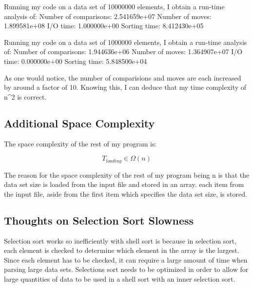 \documentclass{article}
\begin{document}
Running my code on a data set of 10000000 elements, I obtain a run-time analysis of: \newline \newline
\indent Number of comparisons: 2.541659e+07 \newline
\indent Number of moves: 1.899581e+08 \newline
\indent I/O time: 1.000000e+00 \newline
\indent Sorting time: 8.412430e+05 \newline

\noindent Running my code on a data set of 1000000 elements, I obtain a run-time analysis of: \newline \newline
\indent Number of comparisons: 1.944636e+06 \newline
\indent Number of moves: 1.364907e+07 \newline
\indent I/O time: 0.000000e+00 \newline
\indent Sorting time: 5.848500e+04 \newline

\noindent As one would notice, the number of comparisions and moves are each increased by around a factor of 10.
Knowing this, I can deduce that my time complexity of n\^{}2 is correct.

\subsection*{Additional Space Complexity}

The space complexity of the rest of my program is:

\begin{equation*}
  T_{loading} \in \Omega (n)
\end{equation*}

\noindent The reason for the space complexity of the rest of my program being n is that the data set size is loaded from the input file and stored in an array.  each item from the input file, aside from the first item which specifies the data set size, is stored.
\subsection*{Thoughts on Selection Sort Slowness}

Selection sort works so inefficiently with shell sort is because in selection sort, each element is checked to determine which element in the array is the largest.  Since each element has to be checked, it can require a large amount of time when parsing large data sets.
Selections sort needs to be optimized in order to allow for large quantities of data to be used in a shell sort with an inner selection sort.
\end{document}
